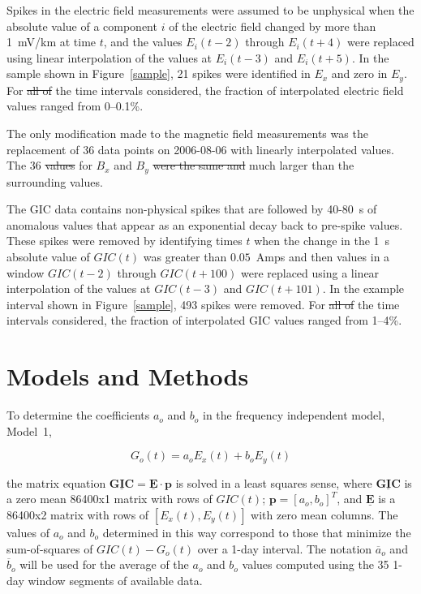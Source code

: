 \documentclass[draft,linenumbers]{agujournal2018}
\providecommand{\DIFaddtex}[1]{{\protect\color{blue}\uwave{#1}}} %
\providecommand{\DIFdeltex}[1]{{\protect\color{red}\sout{#1}}}                      %
\providecommand{\DIFaddbegin}{} %
\providecommand{\DIFaddend}{} %
\providecommand{\DIFdelbegin}{} %
\providecommand{\DIFdelend}{} %
\providecommand{\DIFadd}[1]{\texorpdfstring{\DIFaddtex{#1}}{#1}} %
\providecommand{\DIFdel}[1]{\texorpdfstring{\DIFdeltex{#1}}{}} %
\begin{document}
Spikes in the electric field measurements were assumed to be unphysical when the absolute value of a component $i$ of the electric field changed by more than 1~mV/km at time $t$, and the values $E_i(t-2)$ through $E_i(t+4)$ were replaced using linear interpolation of the values at $E_i(t-3)$ and $E_i(t + 5)$. In the sample shown in Figure~\ref{sample}, 21 spikes were identified in $E_x$ and zero in $E_y$. For \DIFdelbegin \DIFdel{all of }\DIFdelend the time intervals considered, the fraction of interpolated electric field values ranged from 0--0.1\%.

The only modification made to the magnetic field measurements was the replacement of 36 data points on 2006-08-06 with linearly interpolated values. The 36 \DIFdelbegin \DIFdel{values }\DIFdelend \DIFaddbegin \DIFadd{data points }\DIFaddend for $B_x$ and $B_y$ \DIFdelbegin \DIFdel{were the same and }\DIFdelend \DIFaddbegin \DIFadd{have the same value and are }\DIFaddend much larger than the surrounding values.

The GIC data contains non-physical spikes that are followed by 40-80~s of anomalous values that appear as an exponential decay back to pre-spike values. These spikes were removed by identifying times $t$ when the change in the 1~s absolute value of $GIC(t)$ was greater than $0.05$~Amps and then values in a window $GIC(t-2)$ through $GIC(t+100)$ were replaced using a linear interpolation of the values at $GIC(t-3)$ and $GIC(t + 101)$. In the example interval shown in Figure~\ref{sample}, 493 spikes were removed. For \DIFdelbegin \DIFdel{all of }\DIFdelend the time intervals considered, the fraction of interpolated GIC values ranged from 1--4\%.

\section{Models and Methods}

To determine the coefficients $a_o$ and $b_o$ in the frequency independent model, Model~1,

\begin{linenomath*}
\begin{equation}
G_o(t) = a_oE_x(t) + b_oE_y(t)
\label{model1}
\end{equation}
\end{linenomath*}

\noindent
the matrix equation $\underline{\mathbf{GIC}} = \underline{\mathbf{E}}\cdot\mathbf{p}$ is solved in a least squares sense, where $\underline{\mathbf{GIC}}$ is a zero mean 86400x1 matrix with rows of $GIC(t)$; $\mathbf{p} = [a_o,b_o]^T$, and $\underline{\mathbf{E}}$ is a 86400x2 matrix with rows of $[E_x(t), E_y(t)]$ with zero mean columns. The values of $a_o$ and $b_o$ determined in this way correspond to those that minimize the sum-of-squares of $GIC(t)-G_o(t)$ over a 1-day interval. \citep[][provided the mathematically equivalent closed-form equations for solving the matrix equation.]{Pulkkinen2007} The notation $\overline{a}_o$ and $\overline{b}_o$ will be used for the average of the $a_o$ and $b_o$ values computed using the 35 1-day window segments of available data.
\end{document}
